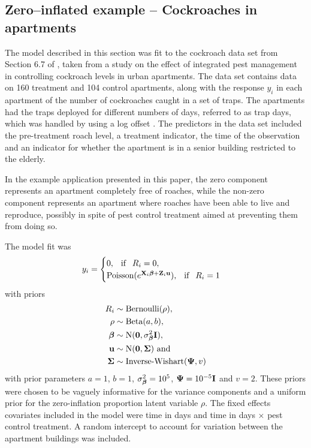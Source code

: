 \subsection{Zero--inflated example -- Cockroaches in apartments}
\label{sec:cockroaches}
The model described in this section was fit  to the cockroach data set from Section 6.7 of
\cite{Gelman2007}, taken from a study on the effect of integrated pest management in controlling
cockroach levels in urban apartments. The data set contains data on 160 treatment and 104 control
apartments, along with the response $y_i$ in each apartment of the number of cockroaches caught in a set
of traps. The apartments had the traps deployed for different numbers of days, referred to as trap days,
which was handled by using a log offset \cite{Agresti2002}. The predictors in the data set included the
pre-treatment roach level, a treatment indicator, the time of the observation and an indicator for
whether the apartment is in a senior building restricted to the elderly.
		
In the example application presented in this paper, the zero component represents an apartment completely free of roaches, while the non-zero component represents an apartment where roaches have been able to live and reproduce, possibly in spite of pest control treatment aimed at preventing them from doing so.

The model fit was
$$
	y_i = \begin{cases}
	0, \phantom{-} \text{if} \phantom{-} R_i = 0, \\
	\text{Poisson}(e^{{\bf X}_i {\boldsymbol \beta} + {\bf Z}_i {\bf u}}), \phantom{-} \text{if} \phantom{-} R_i = 1
	\end{cases}
$$
with priors
\begin{align*}
	R_i &\sim \text{Bernoulli}(\rho), \\
	\rho &\sim \text{Beta}(a, b), \\
	{\boldsymbol \beta} &\sim \text{N}({\bf 0}, \sigma^2_{\boldsymbol \beta} {\bf I}), \\
	{\bf u} &\sim \text{N}({\bf 0}, {\boldsymbol \Sigma}) \text{ and } \\
	{\boldsymbol \Sigma} &\sim \text{Inverse-Wishart}({\boldsymbol \Psi}, v)
\end{align*}
with prior parameters $a = 1$, $b = 1$, $\sigma^2_{\boldsymbol \beta} = 10^5$, ${\boldsymbol \Psi} = 10^{-5} {\bf I}$ and $v = 2$.
These priors were chosen to be vaguely informative for the variance components and a uniform prior for
the zero-inflation proportion latent variable $\rho$. The fixed effects covariates included in the
model were time in days and time in days $\times$ pest control treatment. A random intercept to account
for variation between the apartment buildings was included.
		
